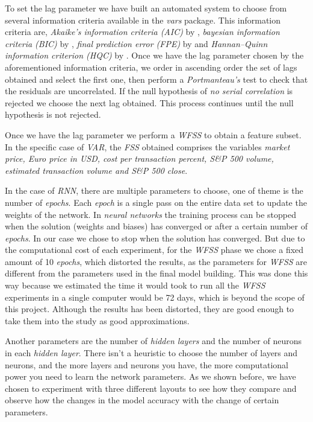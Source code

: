 To set the lag parameter we have built an automated system to choose
from several information criteria available in the \textit{vars}
package. This information criteria are, \textit{Akaike's information
criteria (AIC)} by \cite{akaike1974new}, \textit{bayesian information
criteria (BIC)} by \cite{schwarz1978estimating}, \textit{final
prediction error (FPE)} by \cite{akaike1973infor} and
\textit{Hannan–Quinn information criterion (HQC)} by
\cite{hannan1979determination}. Once we have the lag parameter chosen
by the aforementioned information criteria, we order in ascending
order the set of lags obtained and select the first one, then perform
a \textit{Portmanteau's} test to check that the residuals are
uncorrelated. If the null hypothesis of \textit{no serial correlation}
is rejected we choose the next lag obtained. This process continues
until the null hypothesis is not rejected.

Once we have the lag parameter we perform a \textit{WFSS} to obtain a
feature subset. In the specific case of \textit{VAR}, the \textit{FSS}
obtained comprises the variables \textit{market price, Euro price in
USD, cost per transaction percent, S\&P 500 volume, estimated
transaction volume and S\&P 500 close}.

In the case of \textit{RNN}, there are multiple parameters to choose,
one of theme is the number of \textit{epochs}. Each \textit{epoch} is
a single pass on the entire data set to update the weights of the
network. In \textit{neural networks} the training process can be
stopped when the solution (weights and biases) has converged or after
a certain number of \textit{epochs}. In our case we chose to stop when
the solution has converged. But due to the computational cost of each
experiment, for the \textit{WFSS} phase we chose a fixed amount of 10
\textit{epochs}, which distorted the results, as the parameters for
\textit{WFSS} are different from the parameters used in the final
model building. This was done this way because we estimated the time
it would took to run all the \textit{WFSS} experiments in a single
computer would be 72 days, which is beyond the scope of this project.
Although the results has been distorted, they are good enough to take
them into the study as good approximations.

Another parameters are the number of \textit{hidden layers} and the
number of neurons in each \textit{hidden layer}. There isn't a
heuristic to choose the number of layers and neurons, and the more
layers and neurons you have, the more computational power you need to
learn the network parameters. As we shown before, we have chosen to
experiment with three different layouts to see how they compare and
observe how the changes in the model accuracy with the change of
certain parameters.

